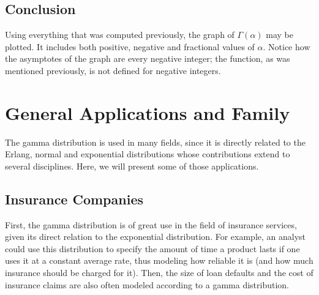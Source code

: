 \documentclass[12pt]{article}
\begin{document}

\pagebreak
\subsection{Conclusion}
Using everything that was computed previously, the graph of $\Gamma(\alpha)$ may be plotted. It includes both positive,
negative and fractional values of $\alpha$. Notice how the asymptotes of the graph are every negative integer; the
function, as was mentioned previously, is not defined for negative integers.


\pagebreak
\section{General Applications and Family}\label{section:generalApplications}

The gamma distribution is used in many fields, since it is directly related to the Erlang, normal and exponential
distributions whose contributions extend to several disciplines. Here, we will present some of those applications.

\subsection{Insurance Companies}
First, the gamma distribution is of great use in the field of insurance services, given its direct relation to the
exponential distribution. For example, an analyst could use this distribution to specify the amount of time a product
lasts if one uses it at a constant average rate, thus modeling how reliable it is (and how much insurance should be
charged for it). Then, the size of loan defaults and the cost of insurance claims are also often modeled according to a
gamma distribution.
\end{document}
